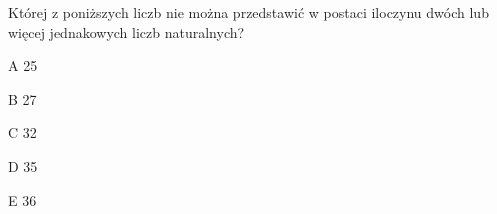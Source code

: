 \begin{tresc}
Której z poniższych liczb nie można przedstawić w postaci iloczynu dwóch lub więcej jednakowych liczb naturalnych?
\end{tresc}
\begin{wariant}{A} 25 \end{wariant}
\begin{wariant}{B} 27 \end{wariant}
\begin{wariant}{C} 32 \end{wariant}
\begin{wariant}{D} 35 \end{wariant}
\begin{wariant}{E} 36 \end{wariant}
